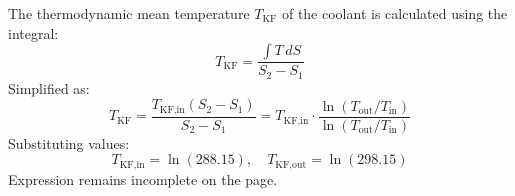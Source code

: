 The thermodynamic mean temperature \( T_{\text{KF}} \) of the coolant is calculated using the integral:  
\[
T_{\text{KF}} = \frac{\int T \, dS}{S_2 - S_1}
\]  
Simplified as:  
\[
T_{\text{KF}} = \frac{T_{\text{KF,in}} (S_2 - S_1)}{S_2 - S_1} = T_{\text{KF,in}} \cdot \frac{\ln(T_{\text{out}} / T_{\text{in}})}{\ln(T_{\text{out}} / T_{\text{in}})}
\]  
Substituting values:  
\[
T_{\text{KF,in}} = \ln(288.15), \quad T_{\text{KF,out}} = \ln(298.15)
\]  
Expression remains incomplete on the page.